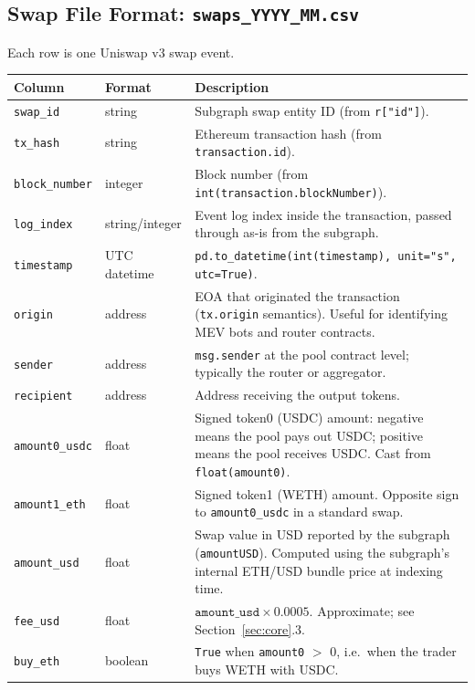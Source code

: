 \documentclass[11pt,a4paper]{article}
\begin{document}
\subsection{Swap File Format: \texttt{swaps\_YYYY\_MM.csv}}

Each row is one Uniswap v3 swap event.

\begin{xltabular}{\linewidth}{L{4.5cm}L{3.0cm}Y}
\toprule
\textbf{Column} & \textbf{Format} & \textbf{Description} \\
\midrule
\texttt{swap\_id} & string & Subgraph swap entity ID (from \texttt{r["id"]}). \\
\texttt{tx\_hash} & string & Ethereum transaction hash (from
  \texttt{transaction.id}). \\
\texttt{block\_number} & integer & Block number (from
  \texttt{int(transaction.blockNumber)}). \\
\texttt{log\_index} & string/integer & Event log index inside the
  transaction, passed through as-is from the subgraph. \\
\texttt{timestamp} & UTC datetime & \texttt{pd.to\_datetime(int(timestamp),
  unit="s", utc=True)}. \\
\texttt{origin} & address & EOA that originated the transaction
  (\texttt{tx.origin} semantics). Useful for identifying MEV bots and
  router contracts. \\
\texttt{sender} & address & \texttt{msg.sender} at the pool contract level;
  typically the router or aggregator. \\
\texttt{recipient} & address & Address receiving the output tokens. \\
\texttt{amount0\_usdc} & float & Signed token0 (USDC) amount:
  negative means the pool pays out USDC; positive means the pool receives
  USDC. Cast from \texttt{float(amount0)}. \\
\texttt{amount1\_eth} & float & Signed token1 (WETH) amount. Opposite sign
  to \texttt{amount0\_usdc} in a standard swap. \\
\texttt{amount\_usd} & float & Swap value in USD reported by the subgraph
  (\texttt{amountUSD}). Computed using the subgraph's internal ETH/USD
  bundle price at indexing time. \\
\texttt{fee\_usd} & float & $\texttt{amount\_usd} \times 0.0005$.
  Approximate; see Section~\ref{sec:core}.3. \\
\texttt{buy\_eth} & boolean & \texttt{True} when
  \texttt{amount0} $>$ 0, i.e.\ when the trader buys WETH with USDC. \\

\end{xltabular}
\end{document}

